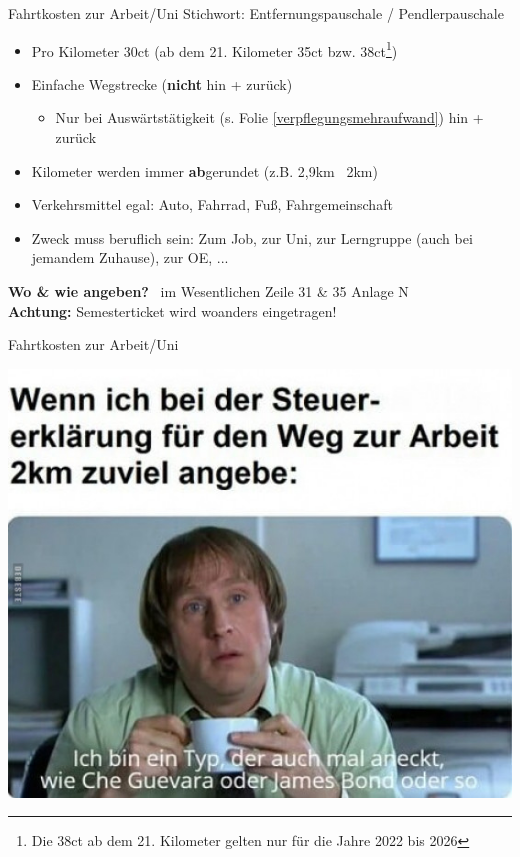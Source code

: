 \documentclass{beamer}
\begin{document}
			\begin{frame}{Fahrtkosten zur Arbeit/Uni}
				Stichwort: Entfernungspauschale / Pendlerpauschale\n
				
				\begin{itemize}
					\item Pro Kilometer 30ct (ab dem 21. Kilometer 35ct bzw. 38ct\footnote{Die 38ct ab dem 21. Kilometer gelten nur für die Jahre 2022 bis 2026})
					\item Einfache Wegstrecke (\textbf{nicht} hin + zurück)
					\begin{itemize}
						\item Nur bei Auswärtstätigkeit (s. Folie \ref{verpflegungsmehraufwand}) hin + zurück
					\end{itemize}
					\item Kilometer werden immer \textbf{ab}gerundet (z.B. 2,9km \textrightarrow\ 2km)
					\item Verkehrsmittel egal: Auto, Fahrrad, Fuß, Fahrgemeinschaft
					\item Zweck muss beruflich sein: Zum Job, zur Uni, zur Lerngruppe (auch bei jemandem Zuhause), zur OE, ...
				\end{itemize}\n\pause
				\textbf{Wo \& wie angeben?} \textrightarrow\ im Wesentlichen Zeile 31 \& 35 Anlage N\\\pause
				\textbf{Achtung:} Semesterticket wird woanders eingetragen!
			\end{frame}
			
			\begin{frame}{Fahrtkosten zur Arbeit/Uni}
				\begin{center}
					\includegraphics[height=0.85\textheight]{images/meme-fahrtkosten.jpg}
				\end{center}
			\end{frame}
		
\end{document}
